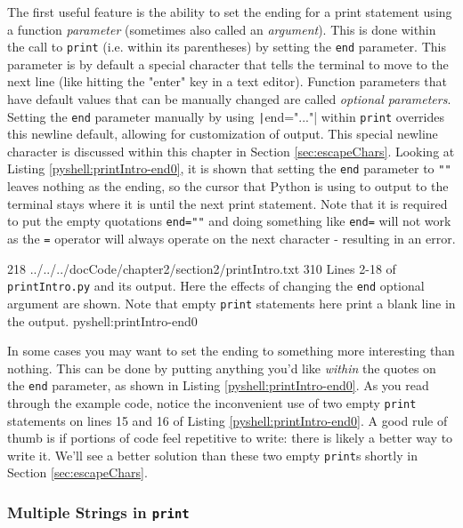\documentclass[oneside]{book}
\begin{document}
The first useful feature is the ability to set the ending for a print statement using a function \emph{parameter} (sometimes also called an \emph{argument}). This is done within the call to \texttt{print} (i.e. within its parentheses) by setting the \texttt{end} parameter. This parameter is by default a special character that tells the terminal to move to the next line (like hitting the "enter" key in a text editor). Function parameters that have default values that can be manually changed are called \textit{optional parameters}. Setting the \texttt{end} parameter manually by using \texttt|end="..."| within \texttt{print} overrides this newline default, allowing for customization of output. This special newline character is discussed within this chapter in Section \ref{sec:escapeChars}. Looking at Listing \ref{pyshell:printIntro-end0}, it is shown that setting the \texttt{end} parameter to \texttt{""} leaves nothing as the ending, so the cursor that Python is using to output to the terminal stays where it is until the next print statement. Note that it is required to put the empty quotations \texttt{end=""} and doing something like \texttt{end=} will not work as the \texttt{=} operator will always operate on the next character - resulting in an error.

{2}{18}
{../../../docCode/chapter2/section2/printIntro.txt}
{3}{10}
{Lines 2-18 of \texttt{printIntro.py} and its output. Here the effects of changing the \texttt{end} optional argument are shown. Note that empty \texttt{print} statements here print a blank line in the output.}
{pyshell:printIntro-end0}

In some cases you may want to set the ending to something more interesting than nothing. This can be done by putting anything you'd like \textit{within} the quotes on the \texttt{end} parameter, as shown in Listing \ref{pyshell:printIntro-end0}. As you read through the example code, notice the inconvenient use of two empty \texttt{print} statements on lines 15 and 16 of Listing \ref{pyshell:printIntro-end0}. A good rule of thumb is if portions of code feel repetitive to write: there is likely a better way to write it. We'll see a better solution than these two empty \texttt{print}s shortly in Section \ref{sec:escapeChars}.

\subsubsection{Multiple Strings in \texttt{print}}\label{sec:printMulti}
\end{document}
